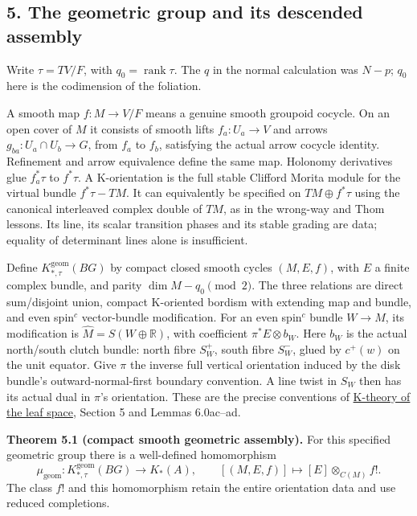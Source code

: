\documentclass[
  11pt,
]{article}
\begin{document}
\subsection{5. The geometric group and its descended
assembly}\label{the-geometric-group-and-its-descended-assembly}

Write \(\tau=TV/F\), with \(q_0=\operatorname{rank}\tau\). The \(q\) in
the normal calculation was \(N-p\); \(q_0\) here is the codimension of
the foliation.

A smooth map \(f:M\to V/F\) means a genuine smooth groupoid cocycle. On
an open cover of \(M\) it consists of smooth lifts \(f_a:U_a\to V\) and
arrows \(g_{ba}:U_a\cap U_b\to G\), from \(f_a\) to \(f_b\), satisfying
the actual arrow cocycle identity. Refinement and arrow equivalence
define the same map. Holonomy derivatives glue \(f_a^*\tau\) to
\(f^*\tau\). A K-orientation is the full stable Clifford Morita module
for the virtual bundle \(f^*\tau-TM\). It can equivalently be specified
on \(TM\oplus f^*\tau\) using the canonical interleaved complex double
of \(TM\), as in the wrong-way and Thom lessons. Its line, its scalar
transition phases and its stable grading are data; equality of
determinant lines alone is insufficient.

Define \(K^{\mathrm{geom}}_{*,\tau}(BG)\) by compact closed smooth
cycles \((M,E,f)\), with \(E\) a finite complex bundle, and parity
\(\dim M-q_0\pmod2\). The three relations are direct sum/disjoint union,
compact K-oriented bordism with extending map and bundle, and even
spin\(^{c}\) vector-bundle modification. For an even spin\(^{c}\) bundle
\(W\to M\), its modification is \(\widehat M=S(W\oplus\mathbb R)\), with
coefficient \(\pi^*E\otimes b_W\). Here \(b_W\) is the actual
north/south clutch bundle: north fibre \(S_W^+\), south fibre \(S_W^-\),
glued by \(c^+(w)\) on the unit equator. Give \(\pi\) the inverse full
vertical orientation induced by the disk bundle's outward-normal-first
boundary convention. A line twist in \(S_W\) then has its actual dual in
\(\pi\)'s orientation. These are the precise conventions of
\href{../NCG-FOLIATIONS/k-theory-of-the-leaf-space.html\#section-6}{K-theory
of the leaf space}, Section 5 and Lemmas 6.0ac--ad.

\textbf{Theorem 5.1 (compact smooth geometric assembly).} For this
specified geometric group there is a well-defined homomorphism \[
 \mu_{\mathrm{geom}}:K^{\mathrm{geom}}_{*,\tau}(BG)\longrightarrow K_*(A),
 \qquad [(M,E,f)]\longmapsto [E]\otimes_{C(M)}f!.
 \tag{5.1}
\] The class \(f!\) and this homomorphism retain the entire orientation
data and use reduced completions.
\end{document}
